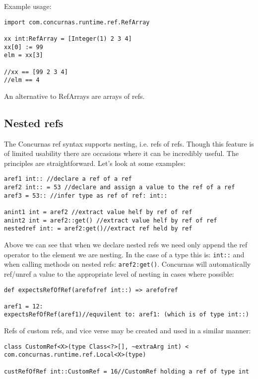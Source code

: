 \documentclass[conc-doc]{subfiles}
\begin{document}
Example usage:

\begin{lstlisting}
import com.concurnas.runtime.ref.RefArray 

xx int:RefArray = [Integer(1) 2 3 4]
xx[0] := 99
elm = xx[3]
	
//xx == [99 2 3 4]
//elm == 4
\end{lstlisting}

An alternative to RefArrays are arrays of refs.

\subsection{Nested refs}
\label{subsec:refofref}
The Concurnas ref syntax supports nesting, i.e. refs of refs. Though this feature is of limited usability there are occasions where it can be incredibly useful. The principles are straightforward. Let's look at some examples:

\begin{lstlisting}
aref1 int:: //declare a ref of a ref
aref2 int:: = 53 //declare and assign a value to the ref of a ref
aref3 = 53:: //infer type as ref of ref: int::

anint1 int = aref2 //extract value helf by ref of ref
anint2 int = aref2::get() //extract value helf by ref of ref
nestedref int: = aref2:get()//extract ref held by ref
\end{lstlisting}

Above we can see that when we declare nested refs we need only append the ref operator to the element we are nesting. In the case of a type this is: \lstinline{int::} and when calling methods on nested refs: \lstinline{aref2:get()}. Concurnas will automatically ref/unref a value to the appropriate level of nesting in cases where possible:

\begin{lstlisting}
def expectsRefOfRef(arefofref int::) => arefofref

aref1 = 12:
expectsRefOfRef(aref1)//equvilent to: aref1: (which is of type int::)
\end{lstlisting}

Refs of custom refs, and vice verse may be created and used in a similar manner:
\begin{lstlisting}
class CustomRef<X>(type Class<?>[], ~extraArg int) < com.concurnas.runtime.ref.Local<X>(type)

custRefOfRef int::CustomRef = 16//CustomRef holding a ref of type int
\end{lstlisting}
\end{document}
